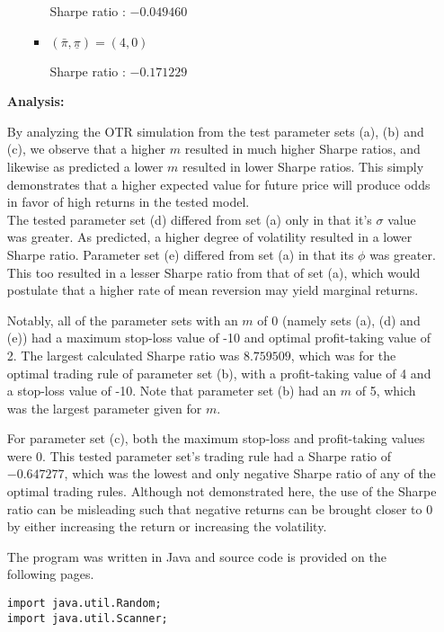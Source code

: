 \documentclass[12pt]{article}
\begin{document}
\begin{enumerate}
\begin{enumerate}
\begin{itemize}
Sharpe ratio : $-0.049460$

\item $(\bar{\pi}, \underline{\pi}) = (4,0)$

Sharpe ratio : $-0.171229$

\end{itemize}

\end{enumerate}

\newpage

\textbf{Analysis:} 
 
 By analyzing the OTR simulation from the test parameter sets (a), (b) and (c), we observe that a higher $m$ resulted in much higher Sharpe ratios, and likewise as predicted a lower $m$ resulted in lower Sharpe ratios. This simply demonstrates that a higher expected value for future price will produce odds in favor of high returns in the tested model. 
\\The tested parameter set (d) differed from set (a) only in that it’s $\sigma$ value was greater. As predicted, a higher degree of volatility resulted in a lower Sharpe ratio. Parameter set (e) differed from set (a) in that its $\phi$ was greater. This too resulted in a lesser Sharpe ratio from that of set (a), which would postulate that a higher rate of mean reversion may yield marginal returns.

Notably, all of the parameter sets with an $m$ of 0 (namely sets (a), (d) and (e)) had a maximum stop-loss value of -10 and optimal profit-taking value of 2. The largest calculated Sharpe ratio was $8.759509$, which was for the optimal trading rule of parameter set (b), with a profit-taking value of 4 and a stop-loss value of -10. Note that parameter set (b) had an $m$ of 5, which was the largest parameter given for $m$. 
 
For parameter set (c), both the maximum stop-loss and profit-taking values were 0. This tested parameter set's trading rule had a Sharpe ratio of $-0.647277$, which was the lowest and only negative Sharpe ratio of any of the optimal trading rules. Although not demonstrated here, the use of the Sharpe ratio can be misleading such that negative returns can be brought closer to 0 by either increasing the return or increasing the volatility.

The program was written in Java and source code is provided on the following pages.

\newpage
\begin{verbatim}
import java.util.Random;
import java.util.Scanner;


\end{verbatim}
\end{enumerate}
\end{document}
